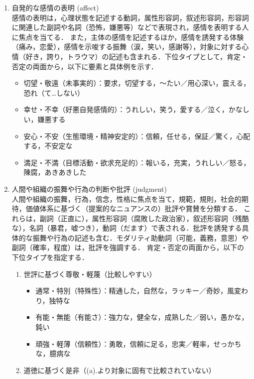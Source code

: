 \documentclass[japanese]{jnlp_1.4}
\begin{document}
\begin{enumerate}
\item 自発的な感情の表明 (affect)\\
感情の表明は，心理状態を記述する動詞，属性形容詞，叙述形容詞，形容詞に関連した副詞や名詞（恐怖，嫌悪等）などで表現され，感情を表明する人に焦点を当てる．
また，主体の感情を記述するほか，感情を誘発する体験（痛み，恋愛），感情を示唆する振舞（涙，笑い，感謝等），対象に対する心情（好き，誇り，トラウマ）の記述も含まれる．下位タイプとして，肯定・否定の両面から，以下に要素と具体例を示す．

\begin{itemize}
\item 切望・敬遠（未事実的）：要求，切望する，〜たい／用心深い，震える，恐れ（て…しない） 
\item 幸せ・不幸（好悪自発感情的）：うれしい，笑う，愛する／泣く，かなしい，嫌悪する
\item 安心・不安（生態環境・精神安定的）：信頼，任せる，保証／驚く，心配する，不安定な
\item 満足・不満（目標活動・欲求充足的）：報いる，充実，うれしい／怒る，陳腐，あきあきした
\end{itemize}

\item 人間や組織の振舞や行為の判断や批評 (judgment)\\
人間や組織の振舞，行為，信念，性格に焦点を当て，規範，規則，社会的期待，価値体系に基づく（提案的なニュアンスの）批評や賞賛を分類する．
これらは，副詞（正直に），属性形容詞（腐敗した政治家），叙述形容詞（残酷な），名詞（暴君，嘘つき），動詞（だます）で表される．批評を誘発する具体的な振舞や行為の記述も含む．モダリティ助動詞（可能，義務，意思）や副詞（確率，程度）は，批評を強調する．
肯定・否定の両面から，以下の下位タイプを指定する．

\begin{enumerate}
\item 世評に基づく尊敬・軽蔑（比較しやすい）

\begin{itemize}
\item 通常・特別（特殊性）：精通した，自然な，ラッキー／奇妙，風変わり，独特な
\item 有能・無能（有能さ）：強力な，健全な，成熟した／弱い，愚かな，鈍い
\item 頑強・軽薄（信頼性）：勇敢，信頼に足る，忠実／軽率，せっかちな，臆病な
\end{itemize}

\item 道徳に基づく是非（(a).より対象に固有で比較されていない）


\end{enumerate}
\end{enumerate}
\end{document}

